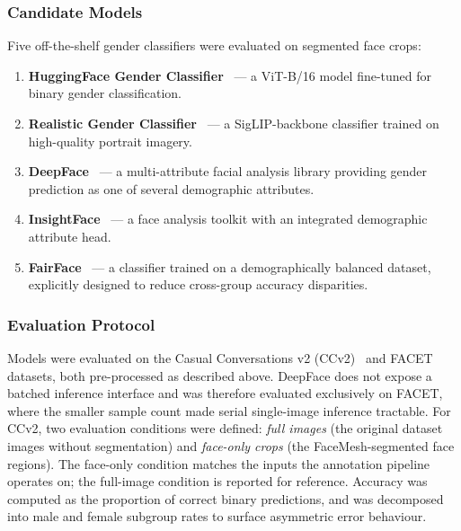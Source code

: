 \subsubsection{Candidate Models}

Five off-the-shelf gender classifiers were evaluated on segmented face crops:

\begin{enumerate}
	\item \textbf{HuggingFace Gender Classifier}~\cite{Rizvandwiki_2023_HuggingFaceGenderClassification} --- a ViT-B/16 model fine-tuned for binary gender classification.
	\item \textbf{Realistic Gender Classifier}~\cite{Tschannen_2025_SigLIP2_RealisticGenderClassifier} --- a SigLIP-backbone classifier trained on high-quality portrait imagery.
	\item \textbf{DeepFace}~\cite{Serengil_2021_HyperExtendedLightFace_DeepFace} --- a multi-attribute facial analysis library providing gender prediction as one of several demographic attributes.
	\item \textbf{InsightFace}~\cite{Deng_2022_ArcFace_InsightFace} --- a face analysis toolkit with an integrated demographic attribute head.
	\item \textbf{FairFace}~\cite{Karkkainen_2021_FairFace} --- a classifier trained on a demographically balanced dataset, explicitly designed to reduce cross-group accuracy disparities.
\end{enumerate}

\subsubsection{Evaluation Protocol}

Models were evaluated on the Casual Conversations v2 (CCv2)~\cite{Porgali_2023_CCv2} and FACET~\cite{Gustafson_2023_FACET} datasets, both pre-processed as described above. DeepFace does not expose a batched inference interface and was therefore evaluated exclusively on FACET, where the smaller sample count made serial single-image inference tractable. For CCv2, two evaluation conditions were defined: \emph{full images} (the original dataset images without segmentation) and \emph{face-only crops} (the FaceMesh-segmented face regions). The face-only condition matches the inputs the annotation pipeline operates on; the full-image condition is reported for reference. Accuracy was computed as the proportion of correct binary predictions, and was decomposed into male and female subgroup rates to surface asymmetric error behaviour.

